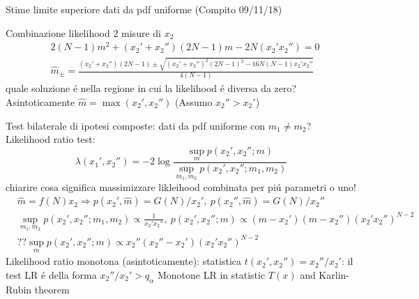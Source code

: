 \begin{wordonframe}{Stime limite superiore dati da pdf uniforme (Compito 09/11/18)}
\begin{block}{Combinazione likelihood 2 misure di $x_2$}
\begin{align*}
&2(N-1)m^2+(x_2'+x_2'')(2N-1)m-2N(x_2'x_2'')=0\\
&\hat{m}_{\pm}=\frac{(x_2'+x_2'')(2N-1)\pm\sqrt{(x_2'+x_2'')^2(2N-1)^2-16N(N-1)x_2'x_2''}}{4(N-1)}
\end{align*}
quale soluzione \'e nella regione in cui la likelihood \'e diversa da zero? Asintoticamente $\hat{m}=\max{(x_2',x_2'')}$ (Assumo $x_2''>x_2'$)
\end{block}
\begin{block}{Test bilaterale di ipotesi composte: dati da pdf uniforme con $m_1\neq m_2$?}
Likelihood ratio test:
\begin{equation*}
\lambda(x_1',x_2'')=-2\log{\frac{\sup_m{p(x_2',x_2'';m)}}{\sup_{m_1,m_2}{p(x_2',x_2'';m_1,m_2)}}}
\end{equation*}
chiarire cosa significa massimizzare likleihood combinata per pi\'u parametri o uno!
\begin{align*}
&\hat{m}=f(N)x_2\Rightarrow p(x_2',\hat{m})=G(N)/x_2',\ p(x_2'',\hat{m})=G(N)/x_2''\\
&\sup_{m_1,m_2}{p(x_2',x_2'';m_1,m_2)}\propto\frac{1}{x_2'x_2''},\ p(x_2',x_2'';m)\propto(m-x_2')(m-x_2'')(x_2'x_2'')^{N-2}\\
&??\sup_{m}p(x_2',x_2'';m)\propto x_2''(x_2''-x_2')(x_2'x_2'')^{N-2}
\end{align*}
Likelihood ratio monotona (asintoticamente): statistica $t(x_2',x_2'')=x_2''/x_2'$: il test LR \'e della forma $x_2''/x_2'>q_{\alpha}$
Monotone LR in statistic $T(x)$ and Karlin-Rubin theorem
\end{block}
\end{wordonframe}

